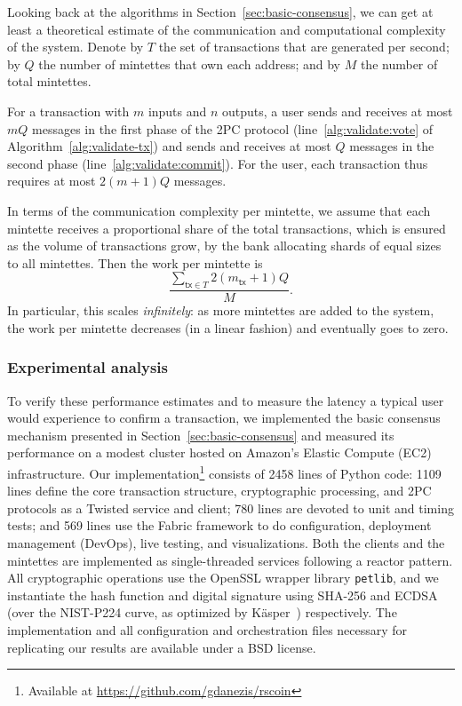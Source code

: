 \documentclass[conference]{IEEEtran}
\newcommand{\tx}{\mathsf{tx}}
\begin{document}
Looking back at the algorithms in Section~\ref{sec:basic-consensus}, we
can get at least a theoretical estimate
of the communication and computational complexity of the system.  Denote by
$T$ the set of transactions that are generated per
second; by $Q$ the number of mintettes that own each address; and by $M$
the number of total mintettes.

For a transaction with $m$ inputs and $n$ outputs, a user sends and receives
at most $mQ$ messages in the first phase of the 2PC protocol
(line~\ref{alg:validate:vote} of Algorithm~\ref{alg:validate-tx}) and sends
and receives at most $Q$ messages in the second phase
(line~\ref{alg:validate:commit}).  For the user, each transaction thus
requires at most $2(m+1)Q$ messages.

In terms of the communication complexity per mintette, we assume that each
mintette receives a proportional share of the total transactions, which is
ensured as the volume of transactions grow, by the bank allocating shards of
equal sizes to all mintettes. Then the work per mintette is
\[
\frac{\sum_{\tx\in T} 2(m_{\tx}+1)Q}{M}.
\]
In particular, this scales \emph{infinitely}: as more mintettes are added to
the system, the work per mintette decreases (in a linear fashion) and
eventually goes to zero.

\subsubsection{Experimental analysis}\label{sec:impl}

To verify these performance estimates and to measure the latency a typical
user would experience to confirm a transaction, we implemented the basic
consensus mechanism presented in Section~\ref{sec:basic-consensus} and
measured its performance on a modest cluster hosted on Amazon's Elastic
Compute (EC2) infrastructure.
Our implementation\footnote{Available at
\url{https://github.com/gdanezis/rscoin}} consists of 2458 lines of Python
code: 1109 lines define
the core transaction structure, cryptographic processing,
and 2PC protocols as a Twisted service and client; 780 lines are devoted to
unit and timing tests; and 569 lines use the Fabric framework to do
configuration, deployment management (DevOps), live testing, and
visualizations.
Both the clients and the mintettes are implemented as single-threaded services
following a reactor pattern.  All cryptographic operations use the OpenSSL
wrapper library \verb#petlib#, and we instantiate the hash function and
digital
signature using SHA-256 and ECDSA (over the NIST-P224 curve, as optimized by
K{\"a}sper~\cite{DBLP:conf/fc/Kasper11}) respectively.  The implementation and
all configuration
and orchestration files necessary for replicating our results are available
under a BSD license.
\end{document}
